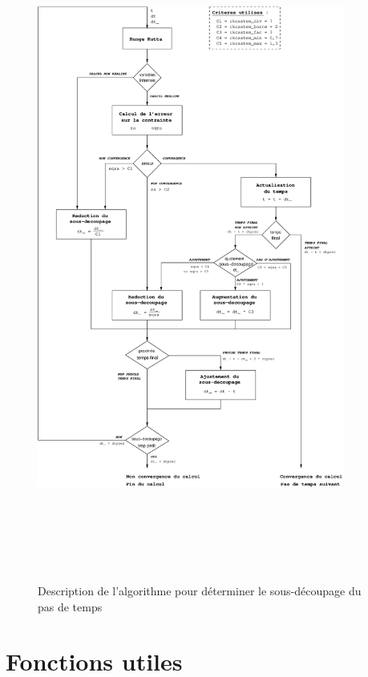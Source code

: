 \documentclass[rectoverso,pleiades,pstricks,leqno,anti]{texmf/note_technique_2010}
\begin{document}
\begin{figure}[htbp]
\centering
\includegraphics[width=0.9\textwidth,height=22cm]{Images/Algo_temps.eps}
\caption{Description de l'algorithme pour déterminer le sous-découpage du pas de temps}
\label{fig:algo_temps}
\end{figure}

\clearpage
\newpage


\clearpage
\newpage
\section{Fonctions utiles}
\end{document}
